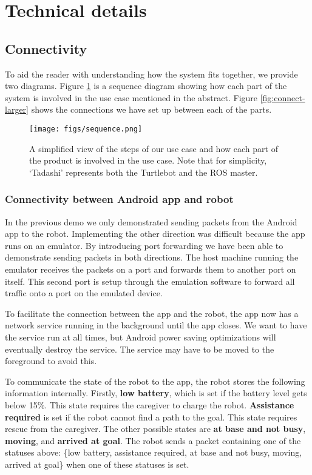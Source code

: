 \documentclass{article}
\begin{document}
\section{Technical details}
\subsection{Connectivity}
To aid the reader with understanding how the system fits together, we provide two diagrams. Figure \ref{fig:seq} is a sequence diagram showing how each part of the system is involved in the use case mentioned in the abstract. Figure \ref{fig:connect-larger} shows the connections we have set up between each of the parts. 

\begin{figure}
  \begin{center}
    \texttt{[image: figs/sequence.png]}
  \end{center}
  \caption{A simplified view of the steps of our use case and how each part of the product is involved in the use case. Note that for simplicity, `Tadashi' represents both the Turtlebot and the ROS master.}
  \label{fig:seq}
\end{figure}

\subsubsection{Connectivity between Android app and robot}
\label{approbot}
In the previous demo we only demonstrated sending packets from the Android app to the robot. Implementing the other direction was difficult because the app runs on an emulator. By introducing port forwarding we have been able to demonstrate sending packets in both directions. The host machine running the emulator receives the packets on a port and forwards them to another port on itself. This second port is setup through the emulation software to forward all traffic onto a port on the emulated device.

To facilitate the connection between the app and the robot, the app now has a network service running in the background until the app closes. We want to have the service run at all times, but Android power saving optimizations will eventually destroy the service. The service may have to be moved to the foreground to avoid this. 

To communicate the state of the robot to the app, the robot stores the following information internally. Firstly, {\bf low battery}, which is set if the battery level gets below 15\%. This state requires the caregiver to charge the robot. {\bf Assistance required} is set if the robot cannot find a path to the goal. This state requires rescue from the caregiver. The other possible states are {\bf at base and not busy}, {\bf moving}, and {\bf arrived at goal}. The robot sends a packet containing one of the statuses above: \{low battery, assistance required, at base and not busy, moving, arrived at goal\} when one of these statuses is set. 
\end{document}
